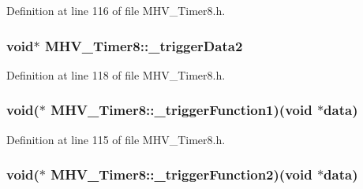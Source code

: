 \-Definition at line 116 of file \-M\-H\-V\-\_\-\-Timer8.\-h.

\hypertarget{class_m_h_v___timer8_a4b78acf417bc2f051cdec4025c57d15b}{
\subsubsection[{\-\_\-trigger\-Data2}]{\setlength{\rightskip}{0pt plus 5cm}void$\ast$ {\bf \-M\-H\-V\-\_\-\-Timer8\-::\-\_\-trigger\-Data2}}}
\label{class_m_h_v___timer8_a4b78acf417bc2f051cdec4025c57d15b}


\-Definition at line 118 of file \-M\-H\-V\-\_\-\-Timer8.\-h.

\hypertarget{class_m_h_v___timer8_a0129830ac565811db27e07a31d635ec9}{
\subsubsection[{\-\_\-trigger\-Function1}]{\setlength{\rightskip}{0pt plus 5cm}void($\ast$ {\bf \-M\-H\-V\-\_\-\-Timer8\-::\-\_\-trigger\-Function1})(void $\ast$data)}}
\label{class_m_h_v___timer8_a0129830ac565811db27e07a31d635ec9}


\-Definition at line 115 of file \-M\-H\-V\-\_\-\-Timer8.\-h.

\hypertarget{class_m_h_v___timer8_a114593dd16cb46412e97c1e8a07bbc6c}{
\subsubsection[{\-\_\-trigger\-Function2}]{\setlength{\rightskip}{0pt plus 5cm}void($\ast$ {\bf \-M\-H\-V\-\_\-\-Timer8\-::\-\_\-trigger\-Function2})(void $\ast$data)}}
\label{class_m_h_v___timer8_a114593dd16cb46412e97c1e8a07bbc6c}


